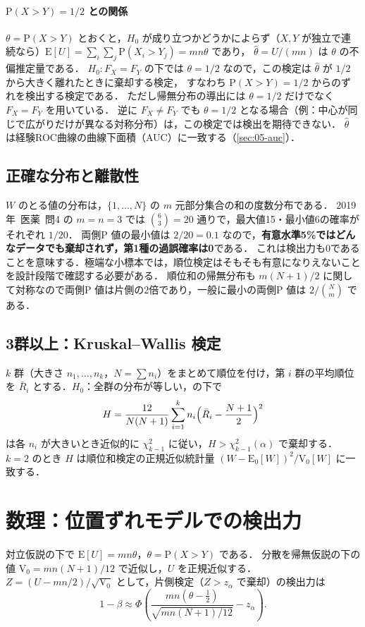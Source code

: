 \documentclass[a4paper,11pt,openany]{ltjsbook}
\newcommand{\tagbox}[2]{\tcbox[on line,boxsep=0.5pt,left=2pt,right=2pt,top=0.5pt,bottom=0.5pt,
  colframe=#1,colback=#1!10,boxrule=0.4pt,arc=1pt]{\scriptsize\bfseries\textcolor{#1}{#2}}}
\newcommand{\Hinshutsu}{\tagbox{bkorange}{頻出}}
\newcommand{\Youchui}{\tagbox{bkpurple}{要注意}}
\newcommand{\kakomon}[2]{\mbox{#1年 医薬 問#2}}
\newcommand{\E}{\mathrm{E}}
\newcommand{\V}{\mathrm{V}}
\newcommand{\Prob}{\mathrm{P}}
\begin{document}
\paragraph{$\Prob(X>Y)=1/2$ との関係}
$\theta=\Prob(X>Y)$ とおくと，$H_0$ が成り立つかどうかによらず（$X,Y$ が独立で連続なら）$\E[U]=\sum_i\sum_j\Prob(X_i>Y_j)=mn\theta$ であり，
$\hat\theta=U/(mn)$ は $\theta$ の不偏推定量である．
$H_0:F_X=F_Y$ の下では $\theta=1/2$ なので，この検定は $\hat\theta$ が $1/2$ から大きく離れたときに棄却する検定，
すなわち $\Prob(X>Y)=1/2$ からのずれを検出する検定である．
ただし帰無分布の導出には $\theta=1/2$ だけでなく $F_X=F_Y$ を用いている．
逆に $F_X\ne F_Y$ でも $\theta=1/2$ となる場合（例：中心が同じで広がりだけが異なる対称分布）は，この検定では検出を期待できない．
$\hat\theta$ は経験ROC曲線の曲線下面積（AUC）に一致する（\cref{sec:05-auc}）．

\subsection{正確な分布と離散性}\label{subsec:03-exact}
\Youchui $W$ のとる値の分布は，$\{1,\dots,N\}$ の $m$ 元部分集合の和の度数分布である．
\kakomon{2019}{4} の $m=n=3$ では $\binom63=20$ 通りで，最大値15・最小値6の確率がそれぞれ $1/20$．
両側P 値の最小値は $2/20=0.1$ なので，\textbf{有意水準5\%ではどんなデータでも棄却されず，第1種の過誤確率は0}である．
これは検出力も0であることを意味する．極端な小標本では，順位検定はそもそも有意になりえないことを設計段階で確認する必要がある．
順位和の帰無分布も $m(N+1)/2$ に関して対称なので両側P 値は片側の2倍であり，一般に最小の両側P 値は $2/\binom{N}{m}$ である．

\subsection{3群以上：Kruskal--Wallis 検定}\label{subsec:03-kw}
$k$ 群（大きさ $n_1,\dots,n_k$，$N=\sum n_i$）をまとめて順位を付け，第 $i$ 群の平均順位を $\bar R_i$ とする．$H_0$：全群の分布が等しい，の下で
\begin{equation}
H=\frac{12}{N(N+1)}\sum_{i=1}^kn_i\Bigl(\bar R_i-\frac{N+1}{2}\Bigr)^2\label{eq:03-kw}
\end{equation}
は各 $n_i$ が大きいとき近似的に $\chi^2_{k-1}$ に従い，$H>\chi^2_{k-1}(\alpha)$ で棄却する．
$k=2$ のとき $H$ は順位和検定の正規近似統計量 $(W-\E_0[W])^2/\V_0[W]$ に一致する．

\section{数理：位置ずれモデルでの検出力}\label{sec:03-power}
\Hinshutsu 対立仮説の下で $\E[U]=mn\theta$，$\theta=\Prob(X>Y)$ である．
分散を帰無仮説の下の値 $\V_0=mn(N+1)/12$ で近似し，$U$ を正規近似する．$Z=(U-mn/2)/\sqrt{\V_0}$ として，片側検定（$Z>z_\alpha$ で棄却）の検出力は
\begin{equation}
1-\beta\approx\Phi\!\left(\frac{mn(\theta-\frac12)}{\sqrt{mn(N+1)/12}}-z_\alpha\right).\label{eq:03-power}
\end{equation}
\end{document}
